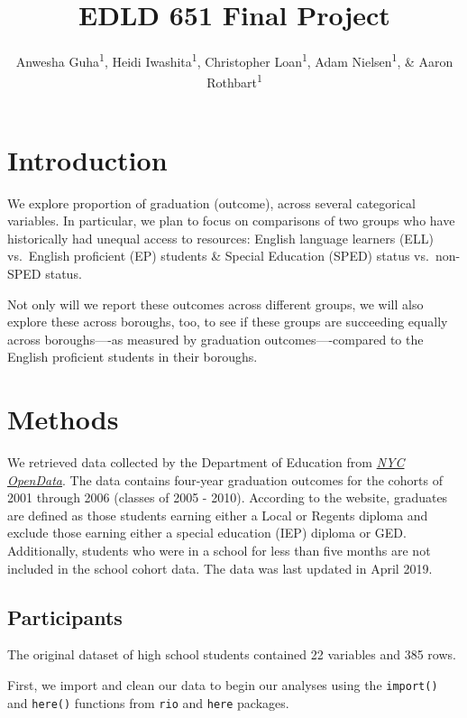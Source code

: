 \documentclass[
  english,
  man, fleqn, noextraspace]{apa6}
\title{EDLD 651 Final Project}
\author{Anwesha Guha\textsuperscript{1}, Heidi Iwashita\textsuperscript{1}, Christopher Loan\textsuperscript{1}, Adam Nielsen\textsuperscript{1}, \& Aaron Rothbart\textsuperscript{1}}
\date{}
\affiliation{\vspace{0.5cm}\textsuperscript{1} University of Oregon}
\begin{document}
\maketitle

\hypertarget{introduction}{%
\section{Introduction}\label{introduction}}

We explore proportion of graduation (outcome), across several categorical variables. In particular, we plan to focus on comparisons of two groups who have historically had unequal access to resources: English language learners (ELL) vs.~English proficient (EP) students \& Special Education (SPED) status vs.~non-SPED status.

Not only will we report these outcomes across different groups, we will also explore these across boroughs, too, to see if these groups are succeeding equally across boroughs----as measured by graduation outcomes----compared to the English proficient students in their boroughs.

\hypertarget{methods}{%
\section{Methods}\label{methods}}

We retrieved data collected by the Department of Education from \href{https://data.cityofnewyork.us/Education/2005-2010-Graduation-Outcomes-By-Borough/avir-tzek}{\emph{NYC OpenData}}. The data contains four-year graduation outcomes for the cohorts of 2001 through 2006 (classes of 2005 - 2010). According to the website, graduates are defined as those students earning either a Local or Regents diploma and exclude those earning either a special education (IEP) diploma or GED. Additionally, students who were in a school for less than five months are not included in the school cohort data. The data was last updated in April 2019.

\hypertarget{participants}{%
\subsection{Participants}\label{participants}}

The original dataset of high school students contained 22 variables and 385 rows.

First, we import and clean our data to begin our analyses using the \texttt{import()} and \texttt{here()} functions from \texttt{rio} and \texttt{here} packages.
\end{document}
